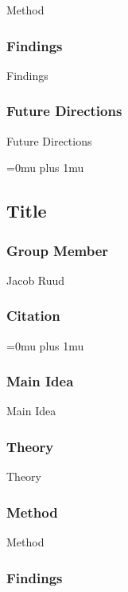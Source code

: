 \noindent
Method

\subsubsection{Findings}

\noindent
Findings

\subsubsection{Future Directions}

\noindent
Future Directions 

\Urlmuskip=0mu plus 1mu\relax

\noindent
\subsection{Title}

\subsubsection{Group Member}

\noindent
Jacob Ruud

\noindent
\subsubsection{Citation}

\Urlmuskip=0mu plus 1mu\relax

\subsubsection{Main Idea}

\noindent
Main Idea

\subsubsection{Theory}

\noindent
Theory

\subsubsection{Method}

\noindent
Method

\subsubsection{Findings}

